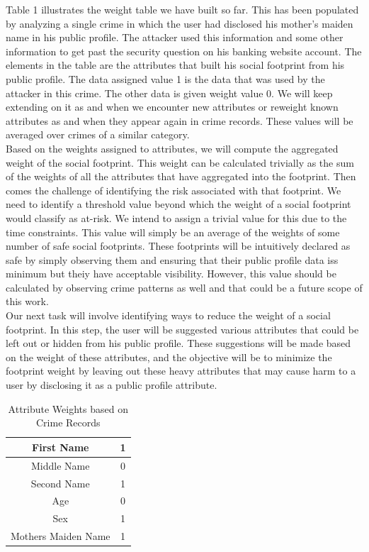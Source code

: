 \documentclass[12pt,conference]{IEEEtran}
\begin{document}
Table 1 illustrates the weight table we have built so far. This has been populated by analyzing a single crime in which the user had disclosed his mother's maiden name in his public profile. The attacker used this information and some other information to get past the security question on his banking website account. The elements in the table are the attributes that built his social footprint from his public profile. The data assigned value 1 is the data that was used by the attacker in this crime. The other data is given weight value 0. We will keep extending on it as and when we encounter new attributes or reweight known attributes as and when they appear again in crime records. These values will be averaged over crimes of a similar category.\\

Based on the weights assigned to attributes, we will compute the aggregated weight of the social footprint. This weight can be calculated trivially as the sum of the weights of all the attributes that have aggregated into the footprint. Then comes the challenge of identifying the risk associated with that footprint. We need to identify a threshold value beyond which the weight of a social footprint would classify as at-risk. We intend to assign a trivial value for this due to the time constraints. This value will simply be an average of the weights of some number of safe social footprints. These footprints will be intuitively declared as safe by simply observing them and ensuring that their public profile data iss minimum but theiy have acceptable visibility. However, this value should be calculated by observing crime patterns as well and that could be a future scope of this work.\\

Our next task will involve identifying ways to reduce the weight of a social footprint. In this step, the user will be suggested various attributes that could be left out or hidden from his public profile. These suggestions will be made based on the weight of these attributes, and the objective will be to minimize the footprint weight by leaving out these heavy attributes that may cause harm to a user by disclosing it as a public profile attribute.


\begin{table}[!t]
\renewcommand{\arraystretch}{3.0}
\caption{Attribute Weights based on Crime Records}
\label{attribute_table}
\centering
\begin{tabular}{|c||c|}
\hline
\large{First Name} & \large{1}\\
\hline
\large{Middle Name} & \large{0}\\
\hline
\large{Second Name} & \large{1}\\
\hline
\large{Age} & \large{0}\\
\hline
\large{Sex} & \large{1}\\
\hline
\large{Mothers Maiden Name} & \large{1}\\
\hline

\end{tabular}
\end{table}
\end{document}
